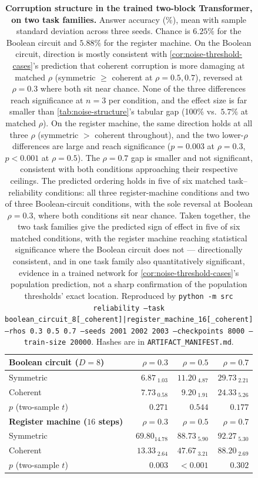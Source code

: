 \begin{table}[htbp]
\centering
\small
\begin{tabular}{lrrr}
\toprule
\textbf{Boolean circuit ($D=8$)} & $\rho=0.3$ & $\rho=0.5$ & $\rho=0.7$ \\
\midrule
Symmetric & $6.87_{\;1.03}$ & $11.20_{\;4.87}$ & $29.73_{\;2.21}$ \\
Coherent & $7.73_{\;0.58}$ & $9.20_{\;1.91}$ & $24.33_{\;5.26}$ \\
$p$ (two-sample $t$) & $0.271$ & $0.544$ & $0.177$ \\
\midrule
\textbf{Register machine ($16$ steps)} & $\rho=0.3$ & $\rho=0.5$ & $\rho=0.7$ \\
\midrule
Symmetric & $69.80_{14.78}$ & $88.73_{\;5.90}$ & $92.27_{\;5.30}$ \\
Coherent & $13.33_{\;2.64}$ & $47.67_{\;3.21}$ & $88.20_{\;2.69}$ \\
$p$ (two-sample $t$) & $0.003$ & $<0.001$ & $0.302$ \\
\bottomrule
\end{tabular}
\caption{\textbf{Corruption structure in the trained two-block
Transformer, on two task families.} Answer accuracy (\%), mean with
sample standard deviation across three seeds. Chance is $6.25\%$ for the
Boolean circuit and $5.88\%$ for the register machine. On the Boolean
circuit, direction is mostly consistent with \cref{cor:noise-threshold-cases}'s
prediction that coherent corruption is more damaging at matched $\rho$
(symmetric $\ge$ coherent at $\rho=0.5,0.7$), reversed at $\rho=0.3$ where
both sit near chance. None of the three differences reach significance at
$n=3$ per condition, and the effect size is far smaller than
\cref{tab:noise-structure}'s tabular gap (100\% vs.\ $5.7\%$ at matched
$\rho$). On the register machine, the same direction holds at all three
$\rho$ (symmetric $>$ coherent throughout), and the two lower-$\rho$
differences are large and reach significance ($p=0.003$ at $\rho=0.3$,
$p<0.001$ at $\rho=0.5$). The $\rho=0.7$ gap is smaller and not
significant, consistent with both conditions approaching their respective
ceilings. The predicted ordering holds in five of six matched
task--reliability conditions: all three register-machine conditions and
two of three Boolean-circuit conditions, with the sole reversal at
Boolean $\rho=0.3$, where both conditions sit near chance. Taken
together, the two task families give the predicted sign of effect in
five of six matched conditions, with the register machine reaching
statistical significance where the Boolean circuit does not ---
directionally consistent, and in one task family also quantitatively
significant, evidence in a trained network for
\cref{cor:noise-threshold-cases}'s population prediction, not a sharp
confirmation of the population thresholds' exact location. Reproduced by
\texttt{python -m src reliability --task
boolean\_circuit\_8[\_coherent]|register\_machine\_16[\_coherent] --rhos
0.3 0.5 0.7 --seeds 2001 2002 2003 --checkpoints 8000 --train-size
20000}. Hashes are in \texttt{ARTIFACT\_MANIFEST.md}.}
\label{tab:trained-corruption-structure}
\end{table}

